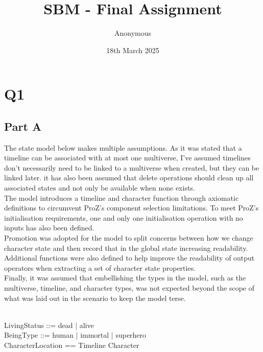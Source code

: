 \documentclass{article}
\title{SBM - Final Assignment}
\date{18th March 2025}
\author{Anonymous}
\begin{document}
\maketitle

\pagebreak 

\section*{Q1}

\subsection*{Part A}

The state model below makes multiple assumptions. As it was stated that a timeline can be associated with at most one multiverse, I’ve assumed timelines don’t necessarily need to be linked to a multiverse when created, but they can be linked later. it has also been assumed that delete operations should clean up all associated states and not only be available when none exists. \\
\newline
The model introduces a timeline and character function through axiomatic definitions to circumvent ProZ's component selection limitations. To meet ProZ's initialisation requirements, one and only one initialisation operation with no inputs has also been defined. \\
\newline
Promotion was adopted for the model to split concerns between how we change character state and then record that in the global state increasing readability. Additional functions were also defined to help improve the readability of output operators when extracting a set of character state properties.  \\
\newline
Finally, it was assumed that embellishing the types in the model, such as the multiverse, timeline, and character types, was not expected beyond the scope of what was laid out in the scenario to keep the model terse.

\begin{zed}
 \\
LivingStatus ::= dead | alive \\
BeingType ::= human | immortal | superhero \\
CharacterLocation == Timeline \cross Character \\
\end{zed}
\end{document}
